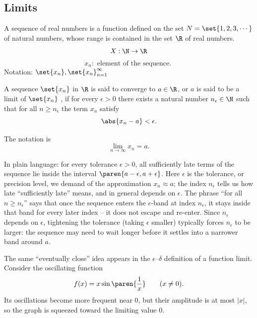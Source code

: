 \subsection{Limits}
A sequence of real numbers is a function defined on the set $N = \set{1, 2, 3, \cdots}$ of natural numbers, whose range is contained 
in the set $\R$ of real numbers. 
\begin{equation*}
    X: \N \to \R
\end{equation*}
\begin{equation*}
    x_n: \text{ element of the sequence. }
\end{equation*}
Notation: $\set{x_n }, \set{x_n }_{n = 1}^{\infty}$

\begin{definition}
    A sequence $\set{x_n }$ in $\R$ is said to converge to $a \in \R$, or $a$ is said to be a limit of $\set{x_n }$ 
    , if for every $\epsilon > 0$ there exists a natural number $n_\epsilon \in \N$ such that for all $n \geq n_\epsilon$
    the term $x_n$ satisfy 
    \begin{equation*}
        \abs{x_n - a} < \epsilon. 
    \end{equation*} 

    The notation is 
    \begin{equation*}
        \lim_{n \to \infty} x_n = a. 
    \end{equation*}
\end{definition}

\begin{remark}
    In plain language: for every tolerance $\epsilon > 0$, all sufficiently late terms of the sequence lie inside the interval
    $\paren{a - \epsilon, a + \epsilon}$. Here $\epsilon$ is the tolerance, or precision level, we demand of the approximation
    $x_n \approx a$; the index $n_\epsilon$ tells us how late ``sufficiently late'' means, and in general depends on $\epsilon$.
    The phrase ``for all $n \geq n_\epsilon$'' says that once the sequence enters the $\epsilon$-band at index $n_\epsilon$, it
    stays inside that band for every later index -- it does not escape and re-enter. Since $n_\epsilon$ depends on $\epsilon$,
    tightening the tolerance (taking $\epsilon$ smaller) typically forces $n_\epsilon$ to be larger: the sequence may need to
    wait longer before it settles into a narrower band around $a$.
\end{remark}

The same ``eventually close'' idea appears in the $\epsilon$--$\delta$ definition of a function limit. Consider the oscillating function
\[
    f(x)=x\sin\paren{\frac1x}\qquad (x\ne0).
\]
Its oscillations become more frequent near $0$, but their amplitude is at most $|x|$, so the graph is squeezed toward the limiting value $0$.

